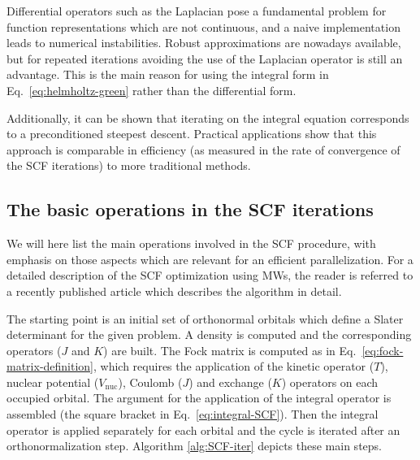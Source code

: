 \documentclass[journal=jctcce, manuscript=article]{achemso}
\begin{document}
Differential operators such as the Laplacian pose a fundamental problem for function representations which are not continuous, and a naive implementation leads to numerical instabilities. Robust approximations are nowadays available\cite{Anderson2019-bx}, but for repeated iterations avoiding the use of the Laplacian operator is still an advantage. This is the main reason for using the integral form in Eq.~\eqref{eq:helmholtz-green} rather than the differential form.

Additionally, it can be shown that iterating on the integral equation corresponds to a preconditioned steepest descent. Practical applications show that this approach is comparable in efficiency (as measured in the rate of convergence of the \ac{SCF} iterations) to more traditional methods.\cite{Harrison2004-fs}

\subsection{The basic operations in the SCF iterations}

We will here list the main operations involved in the \ac{SCF} procedure, with emphasis on those aspects which are relevant for an efficient parallelization. For a detailed description of the \ac{SCF} optimization using \acp{MW}, the reader is referred to a recently published article which describes the algorithm in detail.\cite{Jensen:2022gg}

The starting point is an initial set of orthonormal orbitals which define a Slater determinant for the given problem. A density is computed and the corresponding operators ($J$ and $K$) are built. The Fock matrix is computed as in Eq.~\eqref{eq:fock-matrix-definition}, which requires the application of the kinetic operator ($T$), nuclear potential ($V_{\mathrm{nuc}}$), Coulomb ($J$) and exchange ($K$) operators on each occupied orbital. The argument for the application of the integral operator is assembled (the square bracket in Eq.~\eqref{eq:integral-SCF}). Then the integral operator is applied separately for each orbital and the cycle is iterated after an orthonormalization step. Algorithm \ref{alg:SCF-iter} depicts these main steps.
\end{document}
